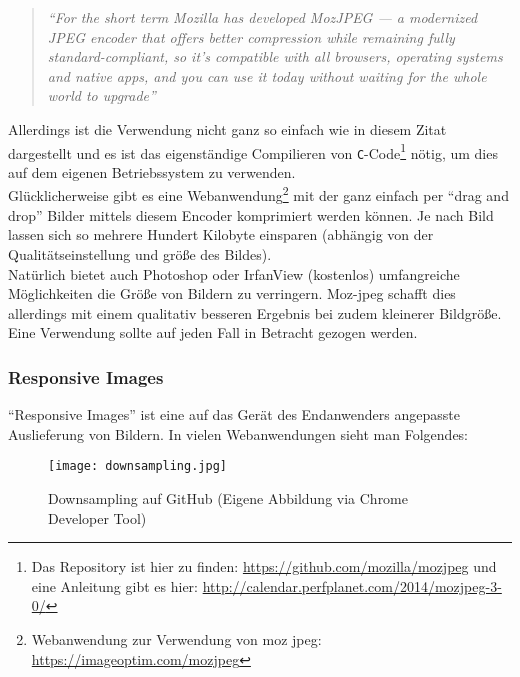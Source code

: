 			\begin{quote}
				\textit{"`For the short term Mozilla has developed MozJPEG — a modernized JPEG encoder that offers better compression while remaining fully standard-compliant, so it’s compatible with all browsers, operating systems and native apps, and you can use it today without waiting for the whole world to upgrade"'\autocite{mozJPEG}}
			\end{quote}

			Allerdings ist die Verwendung nicht ganz so einfach wie in diesem Zitat dargestellt und es ist das eigenständige Compilieren von \texttt{C}-Code\footnote{Das Repository ist hier zu finden: \url{https://github.com/mozilla/mozjpeg} und eine Anleitung gibt es hier: \url{http://calendar.perfplanet.com/2014/mozjpeg-3-0/}} nötig, um dies auf dem eigenen Betriebssystem zu verwenden.\\
			Glücklicherweise gibt es eine Webanwendung\footnote{Webanwendung zur Verwendung von moz jpeg: \url{https://imageoptim.com/mozjpeg}} mit der ganz einfach per "`drag and drop"' Bilder mittels diesem Encoder komprimiert werden können. Je nach Bild lassen sich so mehrere Hundert Kilobyte einsparen (abhängig von der Qualitätseinstellung und größe des Bildes).\\
			Natürlich bietet auch Photoshop oder IrfanView (kostenlos) umfangreiche Möglichkeiten die Größe von Bildern zu verringern. Moz-jpeg schafft dies allerdings mit einem qualitativ besseren Ergebnis bei zudem kleinerer Bildgröße. Eine Verwendung sollte auf jeden Fall in Betracht gezogen werden.


		\subsubsection{Responsive Images} %
		\label{ssub:responsive_images}
			"`Responsive Images"' ist eine auf das Gerät des Endanwenders angepasste Auslieferung von Bildern. In vielen Webanwendungen sieht man Folgendes:

			\begin{figure}[htbp]
				\begin{center}
					\texttt{[image: downsampling.jpg]}
					\caption{Downsampling auf GitHub (Eigene Abbildung via Chrome Developer Tool)}
					\label{fig:downsampling}
				\end{center}
			\end{figure}

